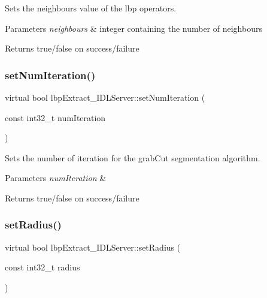 Sets the neighbours value of the lbp operators. 


\begin{DoxyParams}{Parameters}
{\em neighbours} & integer containing the number of neighbours \\
\hline
\end{DoxyParams}
\begin{DoxyReturn}{Returns}
true/false on success/failure 
\end{DoxyReturn}
\mbox{\label{classlbpExtract__IDLServer_a2955fa69c12b59a03c2b1e130747b054}} 
\subsubsection{\texorpdfstring{set\+Num\+Iteration()}{setNumIteration()}}
{\footnotesize\ttfamily virtual bool lbp\+Extract\+\_\+\+I\+D\+L\+Server\+::set\+Num\+Iteration (\begin{DoxyParamCaption}\item[{const int32\+\_\+t}]{num\+Iteration }\end{DoxyParamCaption})\hspace{0.3cm}{\ttfamily [virtual]}}



Sets the number of iteration for the grab\+Cut segmentation algorithm. 


\begin{DoxyParams}{Parameters}
{\em num\+Iteration} & \\
\hline
\end{DoxyParams}
\begin{DoxyReturn}{Returns}
true/false on success/failure 
\end{DoxyReturn}
\mbox{\label{classlbpExtract__IDLServer_a2391f554973a3b7d32d6eea6bbb233d7}} 
\subsubsection{\texorpdfstring{set\+Radius()}{setRadius()}}
{\footnotesize\ttfamily virtual bool lbp\+Extract\+\_\+\+I\+D\+L\+Server\+::set\+Radius (\begin{DoxyParamCaption}\item[{const int32\+\_\+t}]{radius }\end{DoxyParamCaption})\hspace{0.3cm}{\ttfamily [virtual]}}



